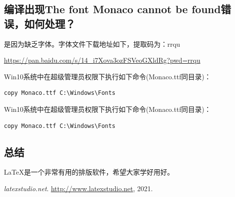 \documentclass[cs4size,a4paper]{ctexart}
\numberwithin{equation}{section}
\numberwithin{table}{section}
\numberwithin{figure}{section}
\begin{document}
\subsection{编译出现The font Monaco cannot be found错误，如何处理？}
是因为缺乏字体。字体文件下载地址如下，提取码为：rrqu 

\url{https://pan.baidu.com/s/14_i7Xova3ozFSVeoGXldRg?pwd=rrqu }

Win10系统中在超级管理员权限下执行如下命令(Monaco.ttf同目录)：
\begin{lstlisting}
copy Monaco.ttf C:\Windows\Fonts
\end{lstlisting}

Win10系统中在超级管理员权限下执行如下命令(Monaco.ttf同目录)：
\begin{lstlisting}
copy Monaco.ttf C:\Windows\Fonts
\end{lstlisting}


\subsection{总结}
LaTeX是一个非常有用的排版软件，希望大家学好用好。



%
                         
\begin{thebibliography}{99}
{\em \color{red}latexstudio.net}. \url{http://www.latexstudio.net}, 2021.
\end{thebibliography}
\end{document}
